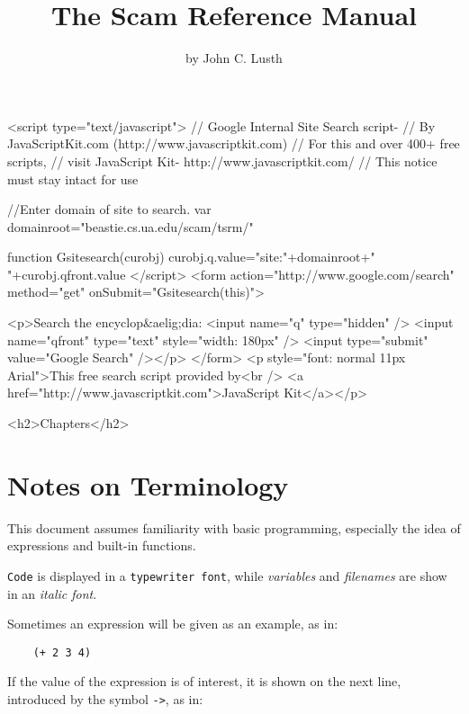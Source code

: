 \documentclass{book}
\title{The Scam Reference Manual}
\author{by John C. Lusth}
\begin{document}
\maketitle

\W\htmlrule
\W{}
\W\htmlrule


\begin{rawxml}

<script
    type="text/javascript">
    // Google Internal Site Search script-
    // By JavaScriptKit.com (http://www.javascriptkit.com)
    // For this and over 400+ free scripts,
    // visit JavaScript Kit- http://www.javascriptkit.com/
    // This notice must stay intact for use

    //Enter domain of site to search.
    var domainroot="beastie.cs.ua.edu/scam/tsrm/"

    function Gsitesearch(curobj)
        {
        curobj.q.value="site:"+domainroot+" "+curobj.qfront.value
        }
    </script>
<form
    action="http://www.google.com/search"
    method="get" onSubmit="Gsitesearch(this)">

    <p>Search the encyclop&aelig;dia: 
    <input name="q" type="hidden" />
    <input name="qfront" type="text" style="width: 180px" />
    <input type="submit" value="Google Search" /></p>
    </form>
<p style="font: normal 11px Arial">This free search script provided by<br />
<a href="http://www.javascriptkit.com">JavaScript Kit</a></p>

<h2>Chapters</h2>
\end{rawxml}

\tableofcontents
\setcounter{tocdepth}{2} 

\chapter{Notes on Terminology}
\label{NotesOnTerminology}

This document assumes familiarity with basic programming,
especially the idea of expressions and built-in functions.

\verb!Code! is displayed in a \verb!typewriter font!, while {\it variables}
and {\it filenames} are show in an {\it italic font}.

Sometimes an expression will be given as an example, as in:

\begin{verbatim}
    (+ 2 3 4)
\end{verbatim}

If the value of the expression is of interest, it is shown
on the next line, introduced by the symbol \verb!->!, as in:
\end{document}
